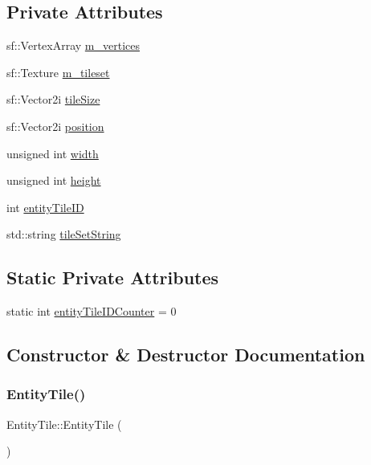 \subsection*{Private Attributes}
\begin{DoxyCompactItemize}
\item 
sf\+::\+Vertex\+Array \mbox{\hyperlink{class_entity_tile_a23eae4039b6b9fd344b9e36c34f9c5f9}{m\+\_\+vertices}}
\item 
sf\+::\+Texture \mbox{\hyperlink{class_entity_tile_a56d45f31668b3ff5934b684dce65f1d7}{m\+\_\+tileset}}
\item 
sf\+::\+Vector2i \mbox{\hyperlink{class_entity_tile_ab2b227fcf7beb0bd6bc40ba2cdf71643}{tile\+Size}}
\item 
sf\+::\+Vector2i \mbox{\hyperlink{class_entity_tile_acd604627c6c2c587a2bb4201bca9b0a4}{position}}
\item 
unsigned int \mbox{\hyperlink{class_entity_tile_a8e83db5f6f4fcabafca37d2a24714676}{width}}
\item 
unsigned int \mbox{\hyperlink{class_entity_tile_af102153f8a56f40d2cec1d53781bc3da}{height}}
\item 
int \mbox{\hyperlink{class_entity_tile_a12416c687d821f5c9d8272b94c5764d4}{entity\+Tile\+ID}}
\item 
std\+::string \mbox{\hyperlink{class_entity_tile_a4cb87a476e5125f272fc704cf51fabb7}{tile\+Set\+String}}
\end{DoxyCompactItemize}
\subsection*{Static Private Attributes}
\begin{DoxyCompactItemize}
\item 
static int \mbox{\hyperlink{class_entity_tile_a48bfcc60158b629788db1357707a9614}{entity\+Tile\+I\+D\+Counter}} = 0
\end{DoxyCompactItemize}


\subsection{Constructor \& Destructor Documentation}
\mbox{\label{class_entity_tile_a7339ed82b7f4d506ef34f99b1446714a}} 
\subsubsection{\texorpdfstring{Entity\+Tile()}{EntityTile()}}
{\footnotesize\ttfamily Entity\+Tile\+::\+Entity\+Tile (\begin{DoxyParamCaption}{ }\end{DoxyParamCaption})}

